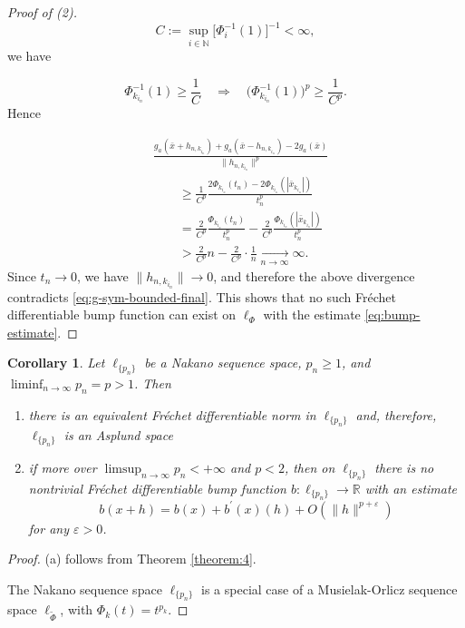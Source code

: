 \documentclass[12pt]{article}
\theoremstyle{thmstyleone}%
\newtheorem{cor}[theorem]{Corollary}%
\theoremstyle{thmstyletwo}%
\theoremstyle{thmstylethree}%
\begin{document}
{{\begin{proof}[Proof of (2)]
\[
  C:=\sup_{i\in\mathbb N}\Big[\Phi_i^{-1}(1)\Big]^{-1}<\infty,
\]
we have


\[
  \Phi_{k_{i_n}}^{-1}(1)\ge \frac{1}{C}
  \quad\Rightarrow\quad
  \big(\Phi_{k_{i_n}}^{-1}(1)\big)^p \ge \frac{1}{C^p}.
\]
Hence


\[
\begin{aligned}
  &\frac{
    g_a(\bar x+h_{n,k_{i_n}})
    +g_a(\bar x-h_{n,k_{i_n}})
    -2g_a(\bar x)
  }{\|h_{n,k_{i_n}}\|^p}
  \\[1mm]
  &\qquad\ge
  \frac{1}{C^p}
  \frac{
    2\Phi_{k_{i_n}}(t_n)-2\Phi_{k_{i_n}}(|\bar x_{k_{i_n}}|)
  }{t_n^p}
  \\
  &\qquad=
  \frac{2}{C^p}\frac{\Phi_{k_{i_n}}(t_n)}{t_n^p}
  -\frac{2}{C^p}\frac{\Phi_{k_{i_n}}(|\bar x_{k_{i_n}}|)}{t_n^p}
  \\
  &\qquad>
  \frac{2}{C^p}n
  -\frac{2}{C^p}\cdot\frac{1}{n}
  \xrightarrow[n\to\infty]{}\infty.
\end{aligned}
\]
Since $t_n\to 0$, we have $\|h_{n,k_{i_n}}\|\to 0$, and therefore the
above divergence contradicts \eqref{eq:g-sym-bounded-final}. This shows
that no such Fr\'echet differentiable bump function can exist on
$\ell_\Phi$ with the estimate \eqref{eq:bump-estimate}.
\end{proof}

}
 

\begin{cor}\label{corollary:18}
	Let $\ell_{\{p_n\}}$ be a Nakano sequence space, $p_n\geq 1$, and
	$\liminf_{n\to\infty}p_n{=p}>1$. Then 
	\begin{enumerate}
		\item[\label=(a)] there is an equivalent Fr\'{e}chet differentiable norm in $\ell_{\{p_n\}}$ and, therefore, $\ell_{\{p_n\}}$ is an Asplund space
		\item[\label=(b)] if more over $\limsup_{n\to\infty}p_n<+\infty${ and $p<2$}, 	
		then on $\ell_{\{p_n\}}$ there is no nontrivial Fr\'{e}chet differentiable bump function $b:\ell_{\{p_n\}}\to\mathbb{R}$ with an estimate
		$$
		b(x+h)=b(x)+b^{\prime}(x)(h)+O(\|h\|^{p+\varepsilon})
		$$ 
		for any $\varepsilon >0$.
	\end{enumerate}
	
\end{cor}
\begin{proof}
	(a) follows from Theorem \ref{theorem:4}.
	
	The Nakano sequence space $\ell_{\{p_n\}}$ is a special case of a 
	Musielak-Orlicz sequence space $\ell_{\widetilde{\Phi}}$, with $\Phi_k(t)=t^{p_k}$.
	

\end{proof}}
\end{document}
